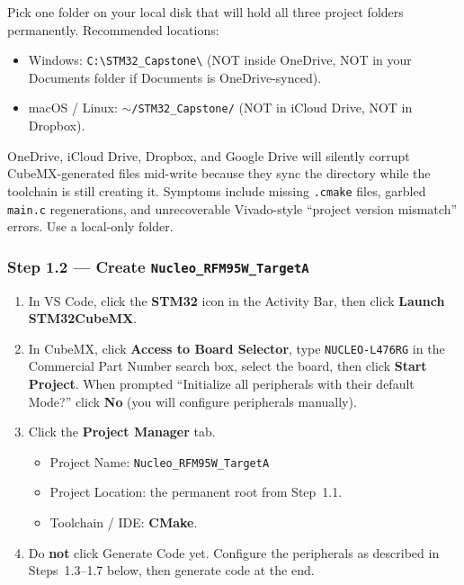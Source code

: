 \documentclass[11pt,letterpaper]{article}
\begin{document}
Pick one folder on your local disk that will hold all three project folders permanently. Recommended locations:
\begin{itemize}[leftmargin=2em]
	\item Windows: \texttt{C:\textbackslash STM32\_Capstone\textbackslash} (NOT inside OneDrive, NOT in your Documents folder if Documents is OneDrive-synced).
	\item macOS / Linux: \texttt{$\sim$/STM32\_Capstone/} (NOT in iCloud Drive, NOT in Dropbox).
\end{itemize}

\begin{tcolorbox}[warning={Do Not Use Cloud-Synced Folders}]
	OneDrive, iCloud Drive, Dropbox, and Google Drive will silently corrupt CubeMX-generated files mid-write because they sync the directory while the toolchain is still creating it. Symptoms include missing \texttt{.cmake} files, garbled \texttt{main.c} regenerations, and unrecoverable Vivado-style ``project version mismatch'' errors. Use a local-only folder.
\end{tcolorbox}

\subsubsection*{Step 1.2 --- Create \texttt{Nucleo\_RFM95W\_TargetA}}

\begin{enumerate}[leftmargin=2em]
	\item In VS Code, click the \textbf{STM32} icon in the Activity Bar, then click \textbf{Launch STM32CubeMX}.
	\item In CubeMX, click \textbf{Access to Board Selector}, type \texttt{NUCLEO-L476RG} in the Commercial Part Number search box, select the board, then click \textbf{Start Project}. When prompted ``Initialize all peripherals with their default Mode?'' click \textbf{No} (you will configure peripherals manually).
	\item Click the \textbf{Project Manager} tab.
	\begin{itemize}[leftmargin=1.2em, topsep=2pt, itemsep=2pt]
		\item Project Name: \texttt{Nucleo\_RFM95W\_TargetA}
		\item Project Location: the permanent root from Step~1.1.
		\item Toolchain / IDE: \textbf{CMake}.
	\end{itemize}
	\item Do \textbf{not} click Generate Code yet. Configure the peripherals as described in Steps~1.3--1.7 below, then generate code at the end.
\end{enumerate}
\end{document}
